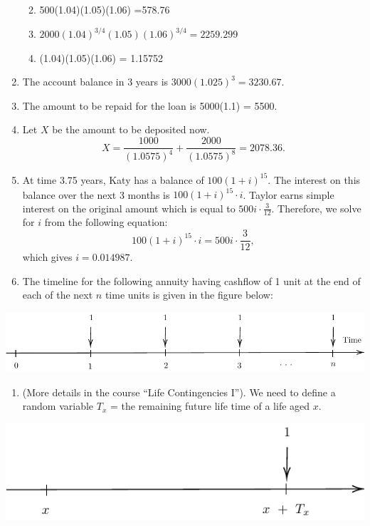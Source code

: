 \documentclass[
]{book}
\providecommand{\tightlist}{%
  \setlength{\itemsep}{0pt}\setlength{\parskip}{0pt}}
\theoremstyle{definition}
\theoremstyle{definition}
\theoremstyle{definition}
\theoremstyle{definition}
\theoremstyle{remark}
\begin{document}
\begin{enumerate}
  \begin{enumerate}
  \def\labelenumii{\arabic{enumii}.}
  \tightlist
  \item
    500(1.04)(1.05)(1.06) =578.76
  \item
    \(2000(1.04)^{3/4}(1.05)(1.06)^{3/4} =2259.299\)
  \item
    (1.04)(1.05)(1.06) = 1.15752
  \end{enumerate}
\item
  The account balance in 3 years is \(3000(1.025)^{3} = 3230.67\).
\item
  The amount to be repaid for the loan is 5000(1.1) = 5500.
\item
  Let \(X\) be the amount to be deposited now.
  \[X = \frac{1000}{(1.0575)^4} + \frac{2000}{(1.0575)^8} = 2078.36. \]
\item
  At time 3.75 years, Katy has a balance of \(100(1+i)^{15}\). The interest on this balance over the next 3 months is \(100(1+i)^{15}\cdot i\).
  Taylor earns simple interest on the original amount which is equal to \(500i\cdot\frac{3}{12}\). Therefore, we solve for \(i\) from the following equation:
  \[ 100(1+i)^{15}\cdot i = 500i\cdot\frac{3}{12},\] which gives \(i = 0.014987.\)
\item
  The timeline for the following annuity having cashflow of 1 unit at the end of each of the next \(n\) time units is given in the figure below:
\end{enumerate}

\begin{center}\includegraphics{SCMA266Bookdownproj_files/figure-latex/tikz-sol1-1} \end{center}

\begin{enumerate}
\def\labelenumi{\arabic{enumi}.}
\setcounter{enumi}{9}
\tightlist
\item
  (More details in the course ``Life Contingencies I''). We need to define a random variable \(T_x\) = the remaining future life time of a life aged \(x\).
\end{enumerate}

\begin{center}\includegraphics{SCMA266Bookdownproj_files/figure-latex/tikz-sol2-1} \end{center}
\end{document}
